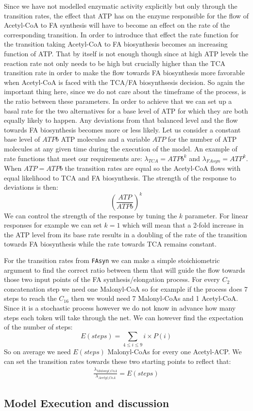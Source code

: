 Since we have not modelled enzymatic
activity explicitly but only through the transition rates, the effect that ATP has on the enzyme responsible
for the flow of Acetyl-CoA to FA synthesis will have to become an effect
on the rate of the corresponding transition. In order to introduce
that effect the rate function for the transition taking Acetyl-CoA to FA biosynthesis
becomes an increasing function of ATP. That by itself
is not enough though since at high ATP levels the reaction rate not only
needs to be high but crucially higher than the TCA transition rate in order to
make the flow towards FA biosynthesis more favorable when Acetyl-CoA
is faced with the TCA/FA biosynthsesis decision. So again the
important thing here, since we do not care about the timeframe of the
process, is the ratio between these parameters. In order to achieve
that we can set up a basal rate for the two alternatives for a
base level of ATP for which they are both equally likely to
happen. Any deviations from that balanced level and the flow towards
FA biosynthesis becomes more or less likely. Let us consider a
constant base level of $ATPb$ ATP molecules and a variable $ATP$ for the number
of ATP molecules at any given time during the execution of the
model. An example of rate functions that meet our requirements are:
$\lambda_{TCA} = ATPb^{k}$ and $\lambda_{FAsyn} =
ATP^{k}$. When $ATP=ATPb$ the transition rates are equal so the
Acetyl-CoA flows with equal likelihood to TCA and FA
biosynthesis. The strength of the response to deviations is then:
\begin{equation*}
\left ( \frac{ATP}{ATPb}\right)^{k}
\end{equation*}
We can control the strength of the response by tuning the $k$
parameter. For linear responses for example we can set $k=1$ which
will mean that a 2-fold increase in the ATP level from its base rate
results in a doubling of the 
rate of the transition towards FA biosynthesis while the rate towards
TCA remains constant.

For the transition rates from \texttt{FAsyn} we can make a simple
stoichiometric argument to find the correct ratio between them that
will guide the flow towards those two input points of the FA
synthesis/elongation process. For every $C_2$ concatenation step we
need one Malonyl-CoA so for example if the process does 7 steps to
reach the $C_{16}$ then we would need 7 Malonyl-CoAs and 1
Acetyl-CoA. Since it is a stochastic process however we do not know in
advance how many steps each token will take through the net. We can
however find the expectation of the number of steps:
\begin{equation*}
E(steps)=\sum_{4 \leq i \leq 9} i \times P(i)
\end{equation*}
So on average we need $E(steps)$ Malonyl-CoAs for every one
Acetyl-ACP. We can set the transition rates towards these two starting
points to reflect that:
\begin{align*}
\frac{\lambda_{Malonyl\_CoA}}{\lambda_{Acetyl\_CoA}} = E(steps)
\end{align*}

\subsection{Model Execution and discussion}

